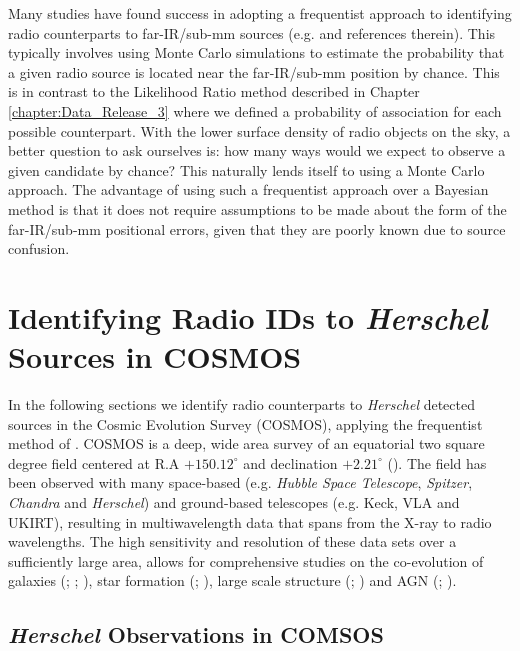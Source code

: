 Many studies have found success in adopting a frequentist approach to identifying radio counterparts to far-IR/sub-mm sources (e.g. \citealt{Eales_2009, Dye_2009, Dunlop_2010} and references therein). This typically involves using Monte Carlo simulations to estimate the probability that a given radio source is located near the far-IR/sub-mm position by chance. This is in contrast to the Likelihood Ratio method described in Chapter \ref{chapter:Data_Release_3} where we defined a probability of association for each possible counterpart. With the lower surface density of radio objects on the sky, a better question to ask ourselves is: how many ways would we expect to observe a given candidate by chance? This naturally lends itself to using a Monte Carlo approach. The advantage of using such a frequentist approach over a Bayesian method is that it does not require assumptions to be made about the form of the far-IR/sub-mm positional errors, given that they are poorly known due to source confusion. 

\section{Identifying Radio IDs to \textit{Herschel} Sources in COSMOS}

In the following sections we identify radio counterparts to \textit{Herschel} detected sources in the Cosmic Evolution Survey (COSMOS), applying the frequentist method of \citealt{Lilly_1999}. COSMOS is a deep, wide area survey of an equatorial two square degree field centered at R.A $+150.12^{\circ}$ and declination $+2.21^{\circ}$ (\citealt{Scoville_2007}). The field has been observed with many space-based (e.g. \textit{Hubble Space Telescope}, \textit{Spitzer}, \textit{Chandra} and \textit{Herschel}) and ground-based telescopes (e.g. Keck, VLA and UKIRT), resulting in multiwavelength data that spans from the X-ray to radio wavelengths. The high sensitivity and resolution of these data sets over a sufficiently large area, allows for comprehensive studies on the co-evolution of galaxies (\citealt{Schreiber_2018}; \citealt{Stockmann_2020}; \citealt{Valentino_2020a}), star formation (\citealt{Gruppioni_2013}; \citealt{Novak_2017}), large scale structure (\citealt{Scoville_2013}; \citealt{Laigle_2018}) and AGN (\citealt{Prescott_2006}; \citealt{Heintz_2016}). 

\subsection{\textit{Herschel} Observations in COMSOS}


